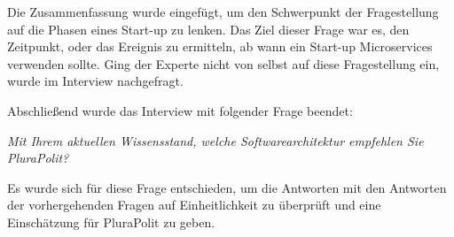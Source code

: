 Die Zusammenfassung wurde eingefügt, um den Schwerpunkt der Fragestellung auf die Phasen eines Start-up zu lenken.
Das Ziel dieser Frage war es, den Zeitpunkt, oder das Ereignis zu ermitteln, ab wann ein Start-up Microservices verwenden sollte. Ging der Experte nicht von selbst auf diese Fragestellung ein, wurde im Interview nachgefragt.

Abschließend wurde das Interview mit folgender Frage beendet:

\textit{Mit Ihrem aktuellen Wissensstand, welche Softwarearchitektur empfehlen Sie PluraPolit?}

Es wurde sich für diese Frage entschieden, um die Antworten mit den Antworten der vorhergehenden Fragen auf Einheitlichkeit zu überprüft und eine Einschätzung für PluraPolit zu geben.
